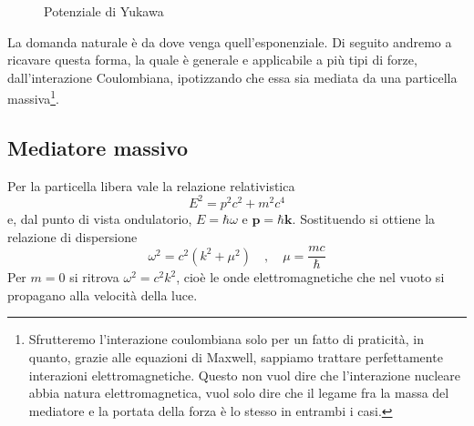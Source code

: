 \begin{figure}[htbp]
\centering
{}
\caption{Potenziale di Yukawa}
\label{fig:yukawa}
\end{figure}

La domanda naturale è da dove venga quell'esponenziale. Di seguito andremo a ricavare questa forma, la quale è generale e applicabile a più tipi di forze, dall'interazione Coulombiana, ipotizzando che essa sia mediata da una particella massiva\footnote{Sfrutteremo l'interazione coulombiana solo per un fatto di praticità, in quanto, grazie alle equazioni di Maxwell, sappiamo trattare perfettamente interazioni elettromagnetiche. Questo non vuol dire che l'interazione nucleare abbia natura elettromagnetica, vuol solo dire che il legame fra la massa del mediatore e la portata della forza è lo stesso in entrambi i casi.}.

\subsection{Mediatore massivo}

Per la particella libera vale la relazione relativistica 
%
\begin{equation*}
    E^2 = p^2 c^2 + m^2 c^4
\end{equation*}
e, dal punto di vista ondulatorio, $E = \hbar \omega$ e $\mathbf{p} = \hbar \mathbf{k}$. Sostituendo si ottiene la relazione di dispersione 
% 
\begin{equation}
    \omega^2 = c^2(k^2 + \mu^2) \quad , \quad \mu = \frac{mc}{\hbar}
\label{eq:particella_massiva}
\end{equation}
Per $m = 0$ si ritrova $\omega^2 = c^2 k^2$, cioè le onde elettromagnetiche che nel vuoto si propagano alla velocità della luce. 


